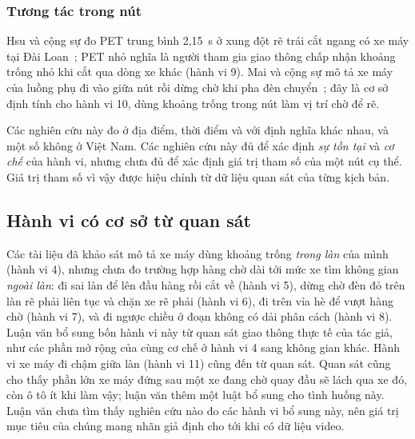 \documentclass[../main.tex]{subfiles}
\begin{document}
\subsubsection{Tương tác trong nút}

Hsu và cộng sự đo PET trung bình 2,15~s ở xung đột rẽ trái cắt ngang có xe máy tại Đài Loan~\cite{hsu2024v2x}; PET nhỏ nghĩa là người tham gia giao thông chấp nhận khoảng trống nhỏ khi cắt qua dòng xe khác (hành vi 9). Mai và cộng sự mô tả xe máy của luồng phụ đi vào giữa nút rồi dừng chờ khi pha đèn chuyển~\cite{mai2019signal}; đây là cơ sở định tính cho hành vi 10, dùng khoảng trống trong nút làm vị trí chờ để rẽ.

Các nghiên cứu này đo ở địa điểm, thời điểm và với định nghĩa khác nhau, và một số không ở Việt Nam. Các nghiên cứu này đủ để xác định \emph{sự tồn tại} và \emph{cơ chế} của hành vi, nhưng chưa đủ để xác định giá trị tham số của một nút cụ thể. Giá trị tham số vì vậy được hiệu chỉnh từ dữ liệu quan sát của từng kịch bản.

\subsection{Hành vi có cơ sở từ quan sát}

Các tài liệu đã khảo sát mô tả xe máy dùng khoảng trống \emph{trong làn} của mình (hành vi 4), nhưng chưa đo trường hợp hàng chờ dài tới mức xe tìm không gian \emph{ngoài làn}: đi sai làn để lên đầu hàng rồi cắt về (hành vi 5), dừng chờ đèn đỏ trên làn rẽ phải liên tục và chặn xe rẽ phải (hành vi 6), đi trên vỉa hè để vượt hàng chờ (hành vi 7), và đi ngược chiều ở đoạn không có dải phân cách (hành vi 8). Luận văn bổ sung bốn hành vi này từ quan sát giao thông thực tế của tác giả, như các phần mở rộng của cùng cơ chế ở hành vi 4 sang không gian khác. Hành vi xe máy đi chậm giữa làn (hành vi 11) cũng đến từ quan sát. Quan sát cũng cho thấy phần lớn xe máy đứng sau một xe đang chờ quay đầu sẽ lách qua xe đó, còn ô tô ít khi làm vậy; luận văn thêm một luật bổ sung cho tình huống này. Luận văn chưa tìm thấy nghiên cứu nào đo các hành vi bổ sung này, nên giá trị mục tiêu của chúng mang nhãn giả định cho tới khi có dữ liệu video.
\end{document}
